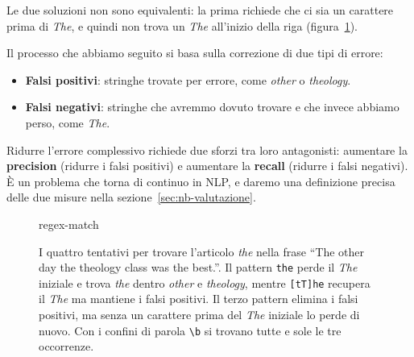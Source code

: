 Le due soluzioni non sono equivalenti: la prima richiede che ci sia un carattere prima di \textit{The}, e quindi non trova un \textit{The} all'inizio della riga (figura~\ref{fig:regex-the}).

Il processo che abbiamo seguito si basa sulla correzione di due tipi di errore:
\begin{itemize}
    \item \textbf{Falsi positivi}: stringhe trovate per errore, come \textit{other} o \textit{theology}.
    \item \textbf{Falsi negativi}: stringhe che avremmo dovuto trovare e che invece abbiamo perso, come \textit{The}.
\end{itemize}
Ridurre l'errore complessivo richiede due sforzi tra loro antagonisti: aumentare la \textbf{precision} (ridurre i falsi positivi) e aumentare la \textbf{recall} (ridurre i falsi negativi). È un problema che torna di continuo in NLP, e daremo una definizione precisa delle due misure nella sezione~\ref{sec:nb-valutazione}.

\begin{figure}[htbp]
\centering
\begin{widget}{regex-match}
\end{widget}
\caption{I quattro tentativi per trovare l'articolo \textit{the} nella frase \enquote{The other day the theology class was the best.}. Il pattern \texttt{the} perde il \textit{The} iniziale e trova \textit{the} dentro \textit{other} e \textit{theology}, mentre \texttt{[tT]he} recupera il \textit{The} ma mantiene i falsi positivi. Il terzo pattern elimina i falsi positivi, ma senza un carattere prima del \textit{The} iniziale lo perde di nuovo. Con i confini di parola \texttt{\textbackslash{}b} si trovano tutte e sole le tre occorrenze.}
\label{fig:regex-the}
\end{figure}

